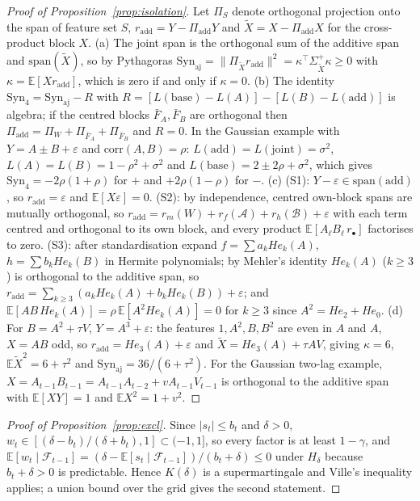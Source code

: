 \documentclass[pdflatex,sn-mathphys-ay]{sn-jnl}%
\theoremstyle{thmstyleone}%
\theoremstyle{thmstyletwo}%
\theoremstyle{thmstylethree}%
\newcommand{\E}{\mathbb{E}}
\newcommand{\F}{\mathcal{F}}
\newcommand{\Syn}{\mathrm{Syn}}
\begin{document}
\begin{appendices}
\begin{proof}[Proof of Proposition~\ref{prop:isolation}]
Let $\Pi_S$ denote orthogonal projection onto the span of feature set $S$, $r_{\mathrm{add}}=Y-\Pi_{\mathrm{add}}Y$ and $\tilde X=X-\Pi_{\mathrm{add}}X$
for the cross-product block $X$.
(a) The joint span is the orthogonal sum of the additive span and $\mathrm{span}(\tilde X)$, so by Pythagoras
$\Syn_{\mathrm{aj}}=\|\Pi_{\tilde X}r_{\mathrm{add}}\|^2=\kappa^\top\Sigma_{\tilde X}^{+}\kappa\ge0$ with $\kappa=\E[Xr_{\mathrm{add}}]$,
which is zero if and only if $\kappa=0$.
(b) The identity $\Syn_4=\Syn_{\mathrm{aj}}-R$ with $R=[L(\mathrm{base})-L(A)]-[L(B)-L(\mathrm{add})]$ is algebra; if the centred blocks
$\bar F_A,\bar F_B$ are orthogonal then $\Pi_{\mathrm{add}}=\Pi_W+\Pi_{\bar F_A}+\Pi_{\bar F_B}$ and $R=0$. In the Gaussian example with $Y=A\pm B+\varepsilon$ and $\mathrm{corr}(A,B)=\rho$:
$L(\mathrm{add})=L(\mathrm{joint})=\sigma^2$, $L(A)=L(B)=1-\rho^2+\sigma^2$ and $L(\mathrm{base})=2\pm2\rho+\sigma^2$, which gives
$\Syn_4=-2\rho(1+\rho)$ for $+$ and $+2\rho(1-\rho)$ for $-$.
(c) (S1): $Y-\varepsilon\in\mathrm{span}(\mathrm{add})$, so $r_{\mathrm{add}}=\varepsilon$ and $\E[X\varepsilon]=0$. (S2): by independence, centred own-block spans are mutually orthogonal, so
$r_{\mathrm{add}}=r_m(W)+r_f(\mathcal A)+r_h(\mathcal B)+\varepsilon$ with each term centred and orthogonal to its own block, and every
product $\E[A_\ell B_\ell\,r_\bullet]$ factorises to zero. (S3): after standardisation expand $f=\sum a_kHe_k(A)$, $h=\sum b_kHe_k(B)$ in Hermite
polynomials; by Mehler's identity $He_k(A)$ ($k\ge3$) is orthogonal to the additive span, so
$r_{\mathrm{add}}=\sum_{k\ge3}(a_kHe_k(A)+b_kHe_k(B))+\varepsilon$; and $\E[AB\,He_k(A)]=\rho\,\E[A^2He_k(A)]=0$ for $k\ge3$ since $A^2=He_2+He_0$.
(d) For $B=A^2+\tau V$, $Y=A^3+\varepsilon$: the features $1,A^2,B,B^2$ are even in $A$ and $A$, $X=AB$ odd, so $r_{\mathrm{add}}=He_3(A)+\varepsilon$ and
$\tilde X=He_3(A)+\tau AV$, giving $\kappa=6$, $\E\tilde X^2=6+\tau^2$ and $\Syn_{\mathrm{aj}}=36/(6+\tau^2)$. For the Gaussian two-lag example,
$X=A_{t-1}B_{t-1}=A_{t-1}A_{t-2}+vA_{t-1}V_{t-1}$ is orthogonal to the additive span with $\E[XY]=1$ and $\E X^2=1+v^2$.
\end{proof}

\begin{proof}[Proof of Proposition~\ref{prop:excl}]
Since $|s_t|\le b_t$ and $\delta>0$, $w_t\in[(\delta-b_t)/(\delta+b_t),1]\subset(-1,1]$, so every factor is at least $1-\gamma$, and
$\E[w_t\mid\F_{t-1}]=(\delta-\E[s_t\mid\F_{t-1}])/(b_t+\delta)\le0$ under $H_\delta$ because $b_t+\delta>0$ is predictable. Hence $K(\delta)$ is a supermartingale and Ville's inequality applies;
a union bound over the grid gives the second statement.
\end{proof}


\end{appendices}
\end{document}
